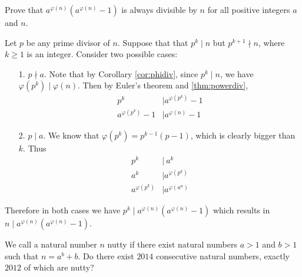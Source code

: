\documentclass[problems.tex]{subfile}
\begin{document}
	\begin{problem}
		Prove that $a^{\varphi(n)}(a^{\varphi(n)}-1)$ is always divisible by $n$ for all positive integers $a$ and $n$.
	\end{problem}

	\begin{solution}
		Let $p$ be any prime divisor of $n$. Suppose that that $p^k \mid  n$ but $p^{k+1} \nmid n$, where $k\geq 1$ is an integer. Consider two possible cases:
		\begin{itemize}
			\item[1.] $p \nmid a$.  Note that by Corollary \eqref{cor:phidiv}, since $p^k \mid  n$, we have $\varphi(p^k) \mid ‌\varphi(n)$. Then by Euler's theorem and \autoref{thm:powerdiv},
				\begin{align*}
					p^k
						& \mid a^{\varphi(p^k)} -1\\
					a^{\varphi(p^k)} -1
						& \mid a^{\varphi(n)} -1
				\end{align*}
			\item[2.] 	$p\mid a$. We know that $\varphi(p^k)=p^{k-1}(p-1)$, which is clearly bigger than $k$. Thus
				\begin{align*}
					p^k
						& \mid  \ a^k \\
					a^{k}
						& \mid a^{\varphi(p^k)}\\
					a^{\varphi(p^k)}
						& \mid a^{\varphi(a^n)}
				\end{align*}
		\end{itemize}
		\noindent Therefore in both cases we have $p^k \mid  a^{\varphi(n)}(a^{\varphi(n)}-1)$ which results in $n\mid a^{\varphi(n)}(a^{\varphi(n)}-1)$.
	\end{solution}

	\begin{problem}
		We call a natural number $n$ nutty if there exist natural numbers $a > 1$ and $b > 1$ such that $n = a^b + b$. Do there exist $2014$ consecutive natural numbers, exactly $2012$ of which are nutty?
	\end{problem}
\end{document}
